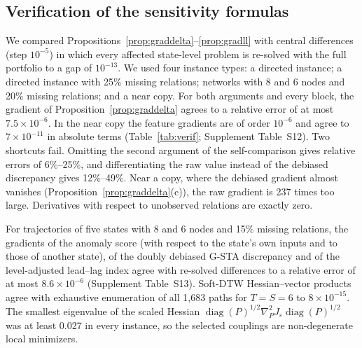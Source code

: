 \subsection{Verification of the sensitivity formulas}\label{sec:verifsens}

We compared Propositions~\ref{prop:graddelta}--\ref{prop:gradll} with central differences (step $10^{-5}$) in which every affected state-level problem is re-solved with the full portfolio to a gap of $10^{-13}$. We used four instance types: a directed instance; a directed instance with 25\% missing relations; networks with 8 and 6 nodes and 20\% missing relations; and a near copy. For both arguments and every block, the gradient of Proposition~\ref{prop:graddelta} agrees to a relative error of at most $7.5\times10^{-6}$. In the near copy the feature gradients are of order $10^{-6}$ and agree to $7\times10^{-11}$ in absolute terms (Table~\ref{tab:verif}; Supplement Table~S12). Two shortcuts fail. Omitting the second argument of the self-comparison gives relative errors of 6\%--25\%, and differentiating the raw value instead of the debiased discrepancy gives 12\%--49\%. Near a copy, where the debiased gradient almost vanishes (Proposition~\ref{prop:graddelta}(c)), the raw gradient is 237 times too large. Derivatives with respect to unobserved relations are exactly zero.

For trajectories of five states with 8 and 6 nodes and 15\% missing relations, the gradients of the anomaly score (with respect to the state's own inputs and to those of another state), of the doubly debiased G-STA discrepancy and of the level-adjusted lead--lag index agree with re-solved differences to a relative error of at most $8.6\times10^{-6}$ (Supplement Table~S13). Soft-DTW Hessian--vector products agree with exhaustive enumeration of all 1{,}683 paths for $T=S=6$ to $8\times10^{-15}$. The smallest eigenvalue of the scaled Hessian $\operatorname{diag}(P)^{1/2}\nabla^2_PJ_\varepsilon\operatorname{diag}(P)^{1/2}$ was at least 0.027 in every instance, so the selected couplings are non-degenerate local minimizers.

